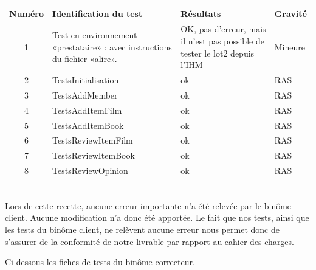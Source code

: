 \documentclass[12pt,a4paper]{report}
\begin{document}
\begin{tabular}{|c|p{4cm}|p{4cm}|p{4cm}|} 
\hline 
Numéro & Identification du test & Résultats & Gravité \\ 
\hline 
1 & Test en environnement «prestataire» : avec instructions du fichier «alire». & OK, pas d'erreur, mais il n'est pas possible de tester le lot2 depuis l'IHM & Mineure \\ 
\hline 
2 & TestsInitialisation & ok & RAS \\ 
\hline 
3 & TestsAddMember & ok & RAS \\ 
\hline 
4 & TestsAddItemFilm & ok & RAS \\ 
\hline 
5 & TestsAddItemBook & ok & RAS \\ 
\hline 
6 & TestsReviewItemFilm & ok & RAS \\ 
\hline 
7 & TestsReviewItemBook & ok & RAS \\ 
\hline 
8 & TestsReviewOpinion & ok & RAS \\ 
\hline 
\end{tabular}\\

Lors de cette recette, aucune erreur importante n'a été relevée par le binôme client. Aucune modification n'a donc été apportée. Le fait que nos tests, ainsi que les tests du binôme client, ne relèvent aucune erreur nous permet donc de s'assurer de la conformité de notre livrable par rapport au cahier des charges.

Ci-dessous les fiches de tests du binôme correcteur.
\end{document}
